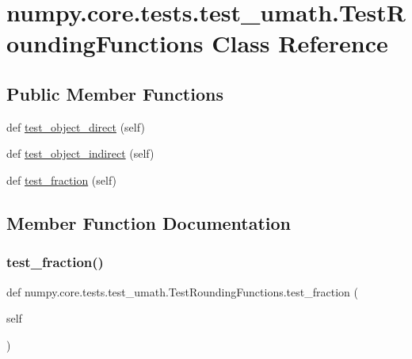 \hypertarget{classnumpy_1_1core_1_1tests_1_1test__umath_1_1TestRoundingFunctions}{}\section{numpy.\+core.\+tests.\+test\+\_\+umath.\+Test\+Rounding\+Functions Class Reference}
\label{classnumpy_1_1core_1_1tests_1_1test__umath_1_1TestRoundingFunctions}
\subsection*{Public Member Functions}
\begin{DoxyCompactItemize}
\item 
def \hyperlink{classnumpy_1_1core_1_1tests_1_1test__umath_1_1TestRoundingFunctions_af860d8229a8b10995083ed19b0339cb8}{test\+\_\+object\+\_\+direct} (self)
\item 
def \hyperlink{classnumpy_1_1core_1_1tests_1_1test__umath_1_1TestRoundingFunctions_a8876da7b1164910c6394c3a0e7efde21}{test\+\_\+object\+\_\+indirect} (self)
\item 
def \hyperlink{classnumpy_1_1core_1_1tests_1_1test__umath_1_1TestRoundingFunctions_a2817105e31d529968071329f35961209}{test\+\_\+fraction} (self)
\end{DoxyCompactItemize}


\subsection{Member Function Documentation}
\mbox{\label{classnumpy_1_1core_1_1tests_1_1test__umath_1_1TestRoundingFunctions_a2817105e31d529968071329f35961209}} 
\subsubsection{\texorpdfstring{test\+\_\+fraction()}{test\_fraction()}}
{\footnotesize\ttfamily def numpy.\+core.\+tests.\+test\+\_\+umath.\+Test\+Rounding\+Functions.\+test\+\_\+fraction (\begin{DoxyParamCaption}\item[{}]{self }\end{DoxyParamCaption})}

